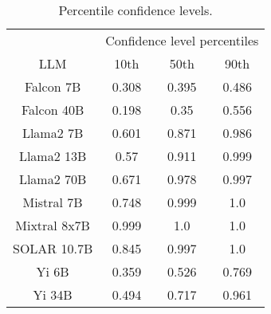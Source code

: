 \begin{table*}
\centering
\begin{tabular}{c|c|c|c}
& \multicolumn{3}{c}{Confidence level percentiles} \\ 
LLM & 10th & 50th & 90th\\ \hline
Falcon 7B & 0.308 & 0.395 & 0.486\\
Falcon 40B & 0.198 & 0.35 & 0.556\\
Llama2 7B & 0.601 & 0.871 & 0.986\\
Llama2 13B & 0.57 & 0.911 & 0.999\\
Llama2 70B & 0.671 & 0.978 & 0.997\\
Mistral 7B & 0.748 & 0.999 & 1.0\\
Mixtral 8x7B & 0.999 & 1.0 & 1.0\\
SOLAR 10.7B & 0.845 & 0.997 & 1.0\\
Yi 6B & 0.359 & 0.526 & 0.769\\
Yi 34B & 0.494 & 0.717 & 0.961\\
\hline
\end{tabular}
\caption{Percentile confidence levels.}
\label{tab:percentile_conf}
\end{table*}
